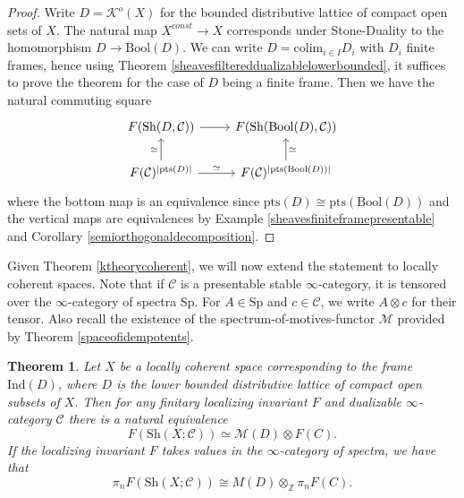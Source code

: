 \documentclass[10pt]{amsart}
\newtheorem{theorem}{Theorem}[section]
\theoremstyle{definition}
\begin{document}
\begin{proof}
Write $D = \mathcal{K}^o(X)$ for the bounded distributive lattice of compact open sets of $X$. The natural map $X^{const} \rightarrow X$ corresponds under Stone-Duality to the homomorphism
$D \rightarrow \mathrm{Bool}(D)$. We can write $D = \mathrm{colim}_{i \in I} D_i$ with $D_i$ finite frames, hence using Theorem \ref{sheavesfiltereddualizablelowerbounded}, it suffices to prove the theorem for the case of $D$ being a finite frame. Then we have the natural commuting square
\[\begin{tikzcd}
	{F( \mathrm{Sh}(D,\mathcal{C}))} & {F( \mathrm{Sh}(\mathrm{Bool}(D),\mathcal{C}))} \\
	{F(\mathcal{C})^{|\mathrm{pts}(D)|}} & {F(\mathcal{C})^{|\mathrm{pts}(\mathrm{Bool}(D))|}}
	\arrow[from=1-1, to=1-2]
	\arrow["\simeq", from=2-1, to=1-1]
	\arrow["\simeq", from=2-1, to=2-2]
	\arrow["\simeq"', from=2-2, to=1-2]
\end{tikzcd}\]
where the bottom map is an equivalence since $\mathrm{pts}(D) \cong \mathrm{pts}(\mathrm{Bool}(D))$ and the vertical maps are equivalences by Example \ref{sheavesfiniteframepresentable} and Corollary \ref{semiorthogonaldecomposition}.
\end{proof}

Given Theorem \ref{ktheorycoherent}, we will now extend the statement to locally coherent spaces. Note that if $\mathcal{C}$ is a presentable stable $\infty$-category, it is tensored over the $\infty$-category of spectra $\mathrm{Sp}$. For $A \in \mathrm{Sp}$ and $c \in \mathcal{C}$, we write $A \otimes c$ for their tensor. Also recall the existence of the spectrum-of-motives-functor $\mathcal{M}$ provided by Theorem \ref{spaceofidempotents}.

\begin{theorem} \label{maintheorem}
Let $X$ be a locally coherent space corresponding to the frame $\mathrm{Ind}(D)$, where $D$ is the lower bounded distributive lattice of compact open subsets of $X$. Then for any finitary localizing invariant $F$ and dualizable $\infty$-category $\mathcal{C}$ there is a natural equivalence
$$F( \mathrm{Sh}(X; \mathcal{C}) ) \simeq \mathcal{M}(D) \otimes F(C).$$
If the localizing invariant $F$ takes values in the $\infty$-category of spectra, we have that
$$\pi_n F( \mathrm{Sh}(X; \mathcal{C}) ) \cong M(D) \otimes_\mathbb{Z} \pi_n F(C).$$
\end{theorem}
\end{document}
